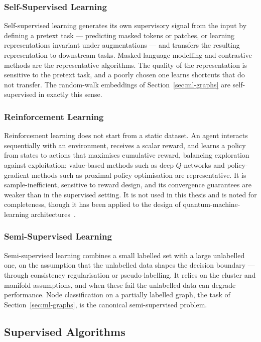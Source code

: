\subsubsection{Self-Supervised Learning}
Self-supervised learning generates its own supervisory signal from the input
by defining a pretext task --- predicting masked tokens or patches, or
learning representations invariant under augmentations --- and transfers the
resulting representation to downstream tasks. Masked language modelling and
contrastive methods are the representative algorithms. The quality of the
representation is sensitive to the pretext task, and a poorly chosen one
learns shortcuts that do not transfer. The random-walk embeddings of
Section~\ref{sec:ml-graphs} are self-supervised in exactly this sense.

\subsubsection{Reinforcement Learning}
Reinforcement learning does not start from a static dataset. An agent
interacts sequentially with an environment, receives a scalar reward, and
learns a policy from states to actions that maximises cumulative reward,
balancing exploration against exploitation; value-based methods such as deep
$Q$-networks and policy-gradient methods such as proximal policy optimisation
are representative. It is sample-inefficient, sensitive to reward design, and
its convergence guarantees are weaker than in the supervised setting. It is
not used in this thesis and is noted for completeness, though it has been
applied to the design of quantum-machine-learning architectures~\cite{Rapp_2024}.

\subsubsection{Semi-Supervised Learning}
Semi-supervised learning combines a small labelled set with a large
unlabelled one, on the assumption that the unlabelled data shapes the decision
boundary --- through consistency regularisation or pseudo-labelling. It relies
on the cluster and manifold assumptions, and when these fail the unlabelled
data can degrade performance. Node classification on a partially labelled
graph, the task of Section~\ref{sec:ml-graphs}, is the canonical
semi-supervised problem.

\subsection{Supervised Algorithms}
\label{sec:ml-supervised}
